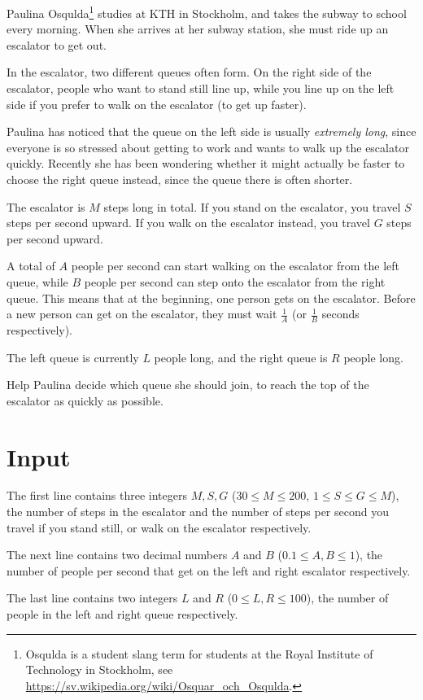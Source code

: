 Paulina Osqulda\footnote{Osqulda is a student slang term for students at the Royal Institute of Technology in Stockholm, see \url{https://sv.wikipedia.org/wiki/Osquar_och_Osqulda}.} studies at KTH in Stockholm, and takes the subway to school every morning.
When she arrives at her subway station, she must ride up an escalator to get out.

In the escalator, two different queues often form.
On the right side of the escalator, people who want to stand still line up, while you line up on the left side if you prefer to walk on the escalator (to get up faster).

Paulina has noticed that the queue on the left side is usually \emph{extremely long}, since everyone is so stressed about getting to work and wants to walk up the escalator quickly.
Recently she has been wondering whether it might actually be faster to choose the right queue instead, since the queue there is often shorter.

The escalator is $M$ steps long in total.
If you stand on the escalator, you travel $S$ steps per second upward.
If you walk on the escalator instead, you travel $G$ steps per second upward.

A total of $A$ people per second can start walking on the escalator from the left queue, while $B$ people per second can step onto the escalator from the right queue.
This means that at the beginning, one person gets on the escalator.
Before a new person can get on the escalator, they must wait $\frac{1}{A}$ (or $\frac{1}{B}$ seconds respectively).

The left queue is currently $L$ people long, and the right queue is $R$ people long.

Help Paulina decide which queue she should join, to reach the top of the escalator as quickly as possible.

\section*{Input}
The first line contains three integers $M, S, G$ ($30 \le M \le 200$, $1 \le S \le G \le M$), the number of steps in the escalator and the number of steps per second you travel if you stand still, or walk on the escalator respectively.

The next line contains two decimal numbers $A$ and $B$ ($0.1 \le A, B \le 1$), the number of people per second that get on the left and right escalator respectively.

The last line contains two integers $L$ and $R$ ($0 \le L, R \le 100$), the number of people in the left and right queue respectively.

